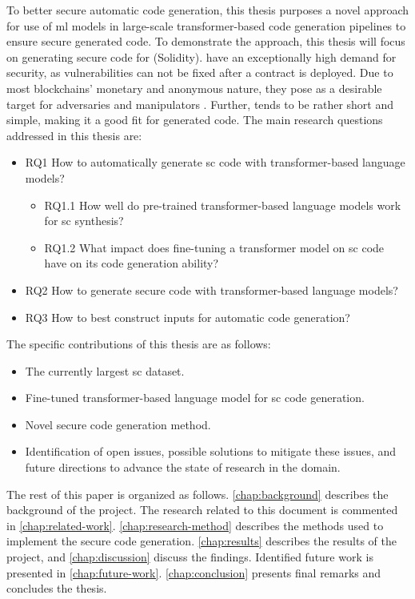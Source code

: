To better secure automatic code generation, this thesis purposes a novel approach for use of \acrshort{ml} models in large-scale transformer-based code generation pipelines to ensure secure generated code. To demonstrate the approach, this thesis will focus on generating secure code for  (Solidity).  have an exceptionally high demand for security, as vulnerabilities can not be fixed after a contract is deployed. Due to most blockchains' monetary and anonymous nature, they pose as a desirable target for adversaries and manipulators \cite{atzei2017survey}. Further,  tends to be rather short and simple, making it a good fit for generated code. The main research questions addressed in this thesis are:
\begin{itemize}
    \item RQ1 How to automatically generate \acrfull{sc} code with transformer-based language models?
    \begin{itemize}
        \item RQ1.1 How well do pre-trained transformer-based language models work for \acrfull{sc} synthesis?
        \item RQ1.2 What impact does fine-tuning a transformer model on \acrfull{sc} code have on its code generation ability?
    \end{itemize}
    \item RQ2 How to generate secure code with transformer-based language models?
    \item RQ3 How to best construct inputs for automatic code generation?
\end{itemize}

\noindent
The specific contributions of this thesis are as follows:
\begin{itemize}
    \item The currently largest \acrfull{sc} dataset.
    \item Fine-tuned transformer-based language model for \acrlong{sc} code generation.
    \item Novel secure code generation method.
    \item Identification of open issues, possible solutions to mitigate these issues, and future directions to advance the state of research in the domain.
\end{itemize}

The rest of this paper is organized as follows. \cref{chap:background} describes the background of the project. The research related to this document is commented in \cref{chap:related-work}. \cref{chap:research-method} describes the methods used to implement the secure code generation. \cref{chap:results} describes the results of the project, and \cref{chap:discussion} discuss the findings. Identified future work is presented in \cref{chap:future-work}. \cref{chap:conclusion} presents final remarks and concludes the thesis.
